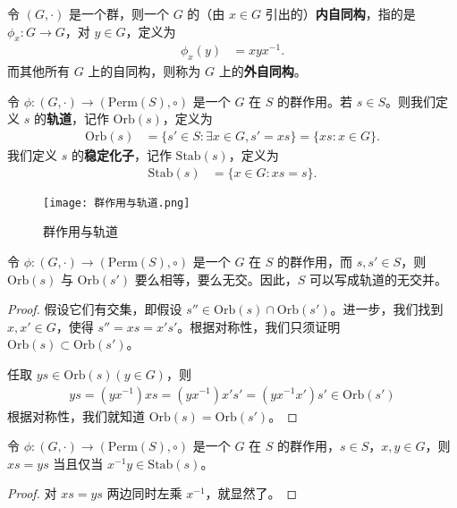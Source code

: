 \documentclass[../../main.tex]{subfiles}
\begin{document}
\begin{definition}[内自同构与外自同构]
令 \((G, \cdot)\) 是一个群，则一个 \(G\) 的（由 \(x \in G\) 引出的）\textbf{内自同构}，指的是 \(\phi_x: G \to G\)，对 \(y \in G\)，定义为
\begin{align*}
\phi_x(y) &= xyx^{-1}.
\end{align*}
而其他所有 \(G\) 上的自同构，则称为 \(G\) 上的\textbf{外自同构}。 
\end{definition}

\begin{definition}[轨道与稳定化子]
令 \(\phi: (G, \cdot) \to (\mathrm{Perm}(S), \circ)\) 是一个 \(G\) 在 \(S\) 的群作用。若 \(s \in S\)。则我们定义 \(s\) 的\textbf{轨道}，记作 \(\mathrm{Orb}(s)\)，定义为
\begin{align*}
\mathrm{Orb}(s) &= \{s' \in S : \exists x \in G, s' = xs\} = \{xs : x \in G\}.
\end{align*}
我们定义 \(s\) 的\textbf{稳定化子}，记作 \(\mathrm{Stab}(s)\)，定义为
\begin{align*}
\mathrm{Stab}(s) &= \{x \in G : xs = s\} .
\end{align*} 
\end{definition}

\begin{figure}[H]
\centering
\texttt{[image: 群作用与轨道.png]}
\caption{群作用与轨道}
\label{figure:群作用与轨道}
\end{figure}

\begin{proposition}
令 $\phi:(G,\cdot)\to(\mathrm{Perm}(S),\circ)$ 是一个 $G$ 在 $S$ 的群作用，而 $s,s'\in S$，则 $\mathrm{Orb}(s)$ 与 $\mathrm{Orb}(s')$ 要么相等，要么无交。因此，$S$ 可以写成轨道的无交并。
\end{proposition}
\begin{proof}
假设它们有交集，即假设 $s''\in\mathrm{Orb}(s)\cap\mathrm{Orb}(s')$。进一步，我们找到 $x,x'\in G$，使得 $s'' = xs = x's'$。根据对称性，我们只须证明 $\mathrm{Orb}(s)\subset\mathrm{Orb}(s')$。

任取 $ys\in\mathrm{Orb}(s)(y\in G)$，则
\begin{align*}
ys=(yx^{-1})xs=(yx^{-1})x's'=(yx^{-1}x')s'\in\mathrm{Orb}(s')
\end{align*}
根据对称性，我们就知道 $\mathrm{Orb}(s)=\mathrm{Orb}(s')$。 
\end{proof}


\begin{lemma}
令 $\phi:(G,\cdot)\to(\mathrm{Perm}(S),\circ)$ 是一个 $G$ 在 $S$ 的群作用，$s\in S$，$x,y\in G$，则 $xs = ys$ 当且仅当 $x^{-1}y\in\mathrm{Stab}(s)$。
\end{lemma}
\begin{proof}
对 $xs = ys$ 两边同时左乘 $x^{-1}$，就显然了。 
\end{proof}
\end{document}
